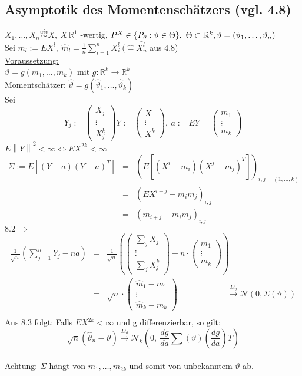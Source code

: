 \documentclass[a4paper,11pt,twoside,titlepage]{article}
\newcommand{\R}{{\mathbb R}}
\newcommand\NN{ \mathcal{N} } %
\newcommand{\uiv}{\ensuremath{\stackrel{uiv}{\sim}}}
\begin{document}
\subsection{Asymptotik des Momentenschätzers (vgl. 4.8)}
$X_1,\ldots,X_n\uiv X,\ X\ \R^1 $ -wertig, $P^X\in\{P_\vartheta:\vartheta\in\Theta\},\ \Theta\subset\R^k,\\  \vartheta=(\vartheta_1,\ldots,\vartheta_n)$\\
Sei $m_l:=EX^l,\ \hat{m}_l=\frac1n\sum_{i=1}^nX_i^l\ (\hat= \bar{X_n^l}$ aus 4.8)\\
\underline{Voraussetzung:}\\
$\vartheta=g(m_1,\ldots,m_k)$ mit $g:\R^k\rightarrow\R^k$\\
Momentschätzer: $\hat{\vartheta}=g(\hat{\vartheta}_1,\ldots,\hat{\vartheta}_k)$\\
Sei $$Y_j:=\begin{pmatrix}X_j\\ \vdots\\ X_j^k\end{pmatrix} Y:=\begin{pmatrix}X\\ \vdots\\ X^k\end{pmatrix},\ 
a:=EY=\begin{pmatrix}m_1\\ \vdots\\ m_k\end{pmatrix} $$
$E\left\|Y\right\|^2<\infty \Leftrightarrow EX^{2k}<\infty$
\begin{eqnarray*}\Sigma:= E[(Y-a)(Y-a)^T]&=&(E[(X^i-m_i)(X^j-m_j)^T])_{i,j=(1,\ldots,k)}\\&=&(EX^{i+j}-m_im_j)_{i,j}\\
&=&(m_{i+j}-m_im_j)_{i,j}\end{eqnarray*}
$8.2\ \Rightarrow$ 
\begin{eqnarray*}
\frac{1}{\sqrt{n}}(\sum_{j=1}^nY_j-na)&=&\frac{1}{\sqrt{n}}\left(
{\begin{pmatrix}\sum_jX_j\\ \vdots\\ \sum_jX_j^k\end{pmatrix}}-n\cdot{\begin{pmatrix}m_1\\ \vdots \\m_k\end{pmatrix}}\right)\\
&=&\sqrt{n}\cdot{\begin{pmatrix}\hat{m}_1-m_1\\ \vdots \\ \hat{m}_k-m_k\end{pmatrix}} \qquad\qquad\qquad\stackrel{D_\vartheta}{\rightarrow}\NN(0,\Sigma(\vartheta))\\
\end{eqnarray*}
Aus 8.3 folgt: Falls $EX^{2k}<\infty$ und g differenzierbar, so gilt:
$$ \sqrt{n}(\hat{\vartheta}_n-\vartheta)\stackrel{D_\vartheta}{\rightarrow}\NN_k(0,\ \frac{dg}{da}\sum(\vartheta)(\frac{dg}{da})T)$$\\
\underline{Achtung:} $\Sigma$ hängt von $m_1,\ldots,m_{2k}$ und somit von unbekanntem $\vartheta$ ab.
\end{document}

